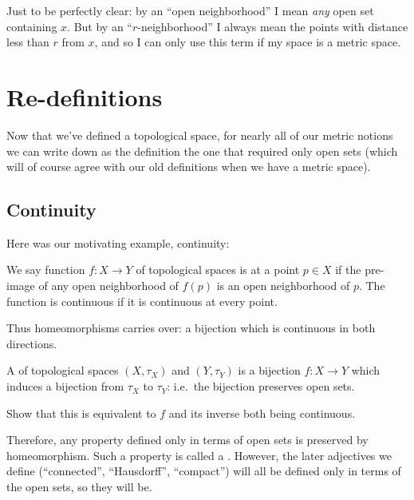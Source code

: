 \begin{abuse}
	Just to be perfectly clear:
	by an ``open neighborhood'' I mean \emph{any} open set containing $x$.
	But by an ``$r$-neighborhood'' I always mean the
	points with distance less than $r$ from $x$,
	and so I can only use this term if my space is a metric space.
\end{abuse}

\section{Re-definitions}
Now that we've defined a topological space,
for nearly all of our metric notions we can write down
as the definition the one that required only open sets
(which will of course agree with our old definitions
when we have a metric space).

\subsection{Continuity}
Here was our motivating example, continuity:
\begin{definition}
	We say function $f \colon X \to Y$ of topological spaces
	is  at a point $p \in X$ if the pre-image of any
	open neighborhood of $f(p)$ is an open neighborhood of $p$.
	The function is continuous if it is continuous at every point.
\end{definition}

Thus homeomorphisms carries over:
a bijection which is continuous in both directions.
\begin{definition}
	A  of topological spaces
	$(X, \tau_X)$ and $(Y, \tau_Y)$
	is a bijection $f \colon X \to Y$
	which induces a bijection from $\tau_X$ to $\tau_Y$:
	i.e.\ the bijection preserves open sets.
\end{definition}
\begin{ques}
	Show that this is equivalent to $f$ and its inverse
	both being continuous.
\end{ques}
Therefore, any property defined only in
terms of open sets is preserved by homeomorphism.
Such a property is called a .
However, the later adjectives we define
(``connected'', ``Hausdorff'', ``compact'') will all be defined
only in terms of the open sets, so they will be.



